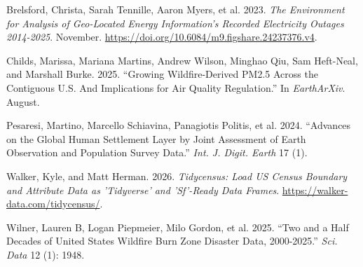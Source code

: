 \documentclass[
  letterpaper,
  DIV=11,
  numbers=noendperiod]{scrartcl}
\newlength{\cslhangindent}
\newenvironment{CSLReferences}[2] %
 {\begin{list}{}{%
  \setlength{\itemindent}{0pt}
  \setlength{\leftmargin}{0pt}
  \setlength{\parsep}{0pt}
  \ifodd #1
   \setlength{\leftmargin}{\cslhangindent}
   \setlength{\itemindent}{-1\cslhangindent}
  \fi
  \setlength{\itemsep}{#2\baselineskip}}}
 {\end{list}}
\begin{document}
\protect{}\label{refs}
\begin{CSLReferences}{1}{1}
Brelsford, Christa, Sarah Tennille, Aaron Myers, et al. 2023. \emph{{The
Environment for Analysis of Geo-Located Energy Information's Recorded
Electricity Outages 2014-2025}}. November.
\url{https://doi.org/10.6084/m9.figshare.24237376.v4}.

Childs, Marissa, Mariana Martins, Andrew Wilson, Minghao Qiu, Sam
Heft-Neal, and Marshall Burke. 2025. {``Growing Wildfire-Derived {PM2.5}
Across the Contiguous {U.S}. And Implications for Air Quality
Regulation.''} In \emph{EarthArXiv}. August.

Pesaresi, Martino, Marcello Schiavina, Panagiotis Politis, et al. 2024.
{``Advances on the Global Human Settlement Layer by Joint Assessment of
Earth Observation and Population Survey Data.''} \emph{Int. J. Digit.
Earth} 17 (1).

Walker, Kyle, and Matt Herman. 2026. \emph{Tidycensus: Load US Census
Boundary and Attribute Data as 'Tidyverse' and 'Sf'-Ready Data Frames}.
\url{https://walker-data.com/tidycensus/}.

Wilner, Lauren B, Logan Piepmeier, Milo Gordon, et al. 2025. {``Two and
a Half Decades of United States Wildfire Burn Zone Disaster Data,
2000-2025.''} \emph{Sci. Data} 12 (1): 1948.

\end{CSLReferences}
\end{document}
